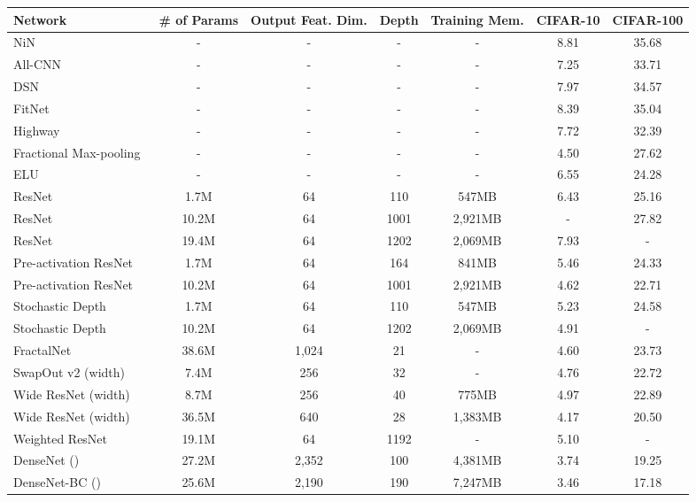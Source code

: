 \documentclass[10pt,twocolumn,letterpaper]{article}
\begin{document}
\begin{table*}[t]
\fontsize{9}{10}\selectfont
\begin{center}
\begin{tabular}{|l|c|c|c|c|c|c|}
\hline
Network & \# of Params & Output Feat. Dim. &  Depth & Training Mem. & CIFAR-10 & CIFAR-100 \\
\hline\hline
NiN~\cite{NiN} & - & - & - & - & 8.81& 35.68\\
All-CNN~\cite{allcnn} & - & - & - & - & 7.25& 33.71\\
DSN~\cite{DSN} & - & - & - & - & 7.97 & 34.57 \\
FitNet~\cite{fitnet} & - & - & - & - & 8.39 & 35.04 \\
Highway~\cite{Highway} & - & - & - & - & 7.72 & 32.39 \\
Fractional Max-pooling~\cite{fracc} & - & - & -& - & 4.50 & 27.62 \\
ELU~\cite{Highway} & - & - & - & - & 6.55 & 24.28 \\
\hline
ResNet~\cite{resnet} & 1.7M & 64 & 110 & 547MB & 6.43& 25.16\\
ResNet~\cite{resnet} & 10.2M & 64 & 1001 & 2,921MB & - & 27.82\\
ResNet~\cite{resnet} & 19.4M & 64 & 1202 & 2,069MB & 7.93& -\\
\hline
Pre-activation ResNet~\cite{preresnet} & 1.7M & 64 & 164 & 841MB & 5.46& 24.33\\
Pre-activation ResNet~\cite{preresnet} & 10.2M & 64 & 1001 & 2,921MB & 4.62& 22.71\\
\hline
Stochastic Depth~\cite{stochasticdepth} & 1.7M & 64 &  110 & 547MB & 5.23& 24.58\\
Stochastic Depth~\cite{stochasticdepth} & 10.2M & 64 & 1202 & 2,069MB & 4.91& -\\
\hline
FractalNet~\cite{fractalnet} & 38.6M & 1,024 & 21 & - & 4.60& 23.73\\
\hline
SwapOut v2 (width)~\cite{swapout} & 7.4M & 256 & 32 & - & 4.76& 22.72\\
\hline
Wide ResNet (width)~\cite{wideresnet} & 8.7M & 256 & 40 & 775MB & 4.97& 22.89\\
Wide ResNet (width)~\cite{wideresnet} & 36.5M & 640 & 28 & 1,383MB & 4.17& 20.50\\
\hline
Weighted ResNet~\cite{weightedresnet} & 19.1M & 64 & 1192 & - & 5.10& -\\
\hline
DenseNet ()~\cite{densenet} & 27.2M & 2,352 & 100 & 4,381MB & 3.74 & 19.25 \\
DenseNet-BC ()~\cite{densenet} & 25.6M & 2,190 & 190 & 7,247MB & 3.46 & 17.18 \\

\end{tabular}
\end{center}
\end{table*}
\end{document}
